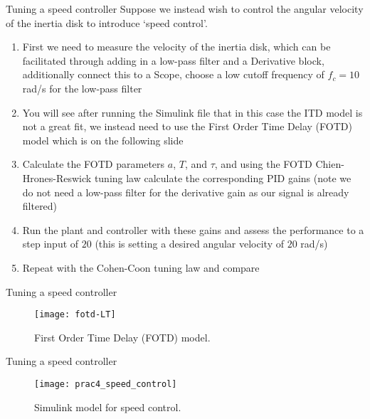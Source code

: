 \documentclass[9pt]{beamer-control}
\begin{document}

\begin{frame}{Tuning a speed controller}
Suppose we instead wish to control the angular velocity of the inertia disk to introduce `speed control'. 

\begin{enumerate}
	\item First we need to measure the velocity of the inertia disk, which can be facilitated through adding in a low-pass filter and a Derivative block, additionally connect this to a Scope, choose a low cutoff frequency of $f_c=10$ rad/s for the low-pass filter
	\item You will see after running the Simulink file that in this case the ITD model is not a great fit, we instead need to use the First Order Time Delay (FOTD) model which is on the following slide
	\item Calculate the FOTD parameters $a$, $T$, and $\tau$, and using the FOTD Chien-Hrones-Reswick tuning law calculate the corresponding PID gains (note we do not need a low-pass filter for the derivative gain as our signal is already filtered)
	\item Run the plant and controller with these gains and assess the performance to a step input of $20$ (this is setting a desired angular velocity of $20$ rad/s)
	\item Repeat with the Cohen-Coon tuning law and compare
\end{enumerate}

\end{frame}

\begin{frame}{Tuning a speed controller}
	\begin{figure}
	\centering
	\texttt{[image: fotd-LT]}
	\caption{First Order Time Delay (FOTD) model.}
\end{figure}
\end{frame}

\begin{frame}{Tuning a speed controller}
	\begin{figure}
		\centering
		\texttt{[image: prac4\_speed\_control]}
		\caption{Simulink model for speed control.}
	\end{figure}
\end{frame}
\end{document}
